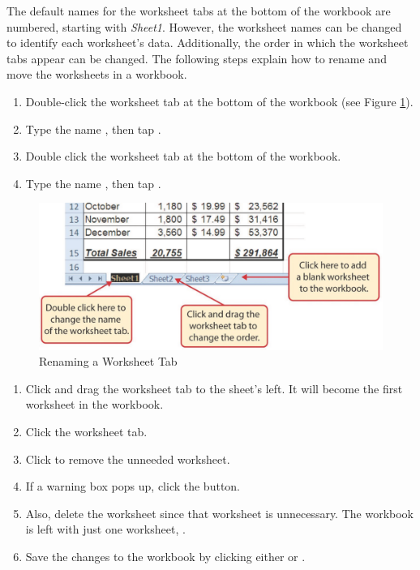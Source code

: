 The default names for the worksheet tabs at the bottom of the workbook are numbered, starting with \textit{Sheet1}. However, the worksheet names can be changed to identify each worksheet's data. Additionally, the order in which the worksheet tabs appear can be changed. The following steps explain how to rename and move the worksheets in a workbook.

\begin{enumbox}
	\begin{enumerate}
		\item Double-click the  worksheet tab at the bottom of the workbook (see Figure \ref{01:fig47}). 
		\item Type the name , then tap  .
		\item Double click the  worksheet tab at the bottom of the workbook.
		\item Type the name , then tap  .
	\end{enumerate}
\end{enumbox}

\begin{figure}[H]
	\centering
	\includegraphics[width=\maxwidth{.95\linewidth}]{gfx/ch01_fig47}
	\caption{Renaming a Worksheet Tab}
	\label{01:fig47}
\end{figure}

\begin{enumbox}
	\begin{enumerate}
		\item Click and drag the  worksheet tab to the  sheet's left. It will become the first worksheet in the workbook.
		\item Click the  worksheet tab.
		\item Click  to remove the unneeded worksheet.
		\item If a warning box pops up, click the  button.
		\item Also, delete the  worksheet since that worksheet is unnecessary. The workbook is left with just one worksheet, .
		\item Save the changes to the workbook by clicking either  or .
	\end{enumerate}
\end{enumbox}
	
